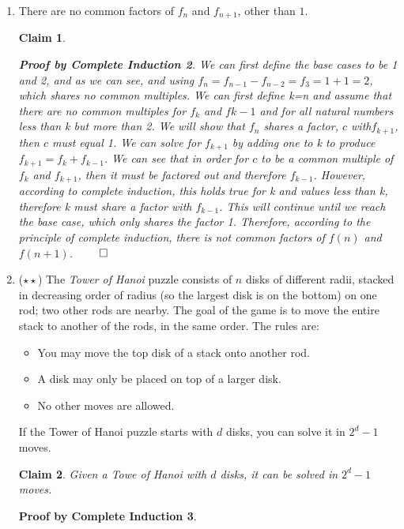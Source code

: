 \documentclass[10pt]{letter}
\newtheorem{PBCI}{Proof by Complete Induction}
\newtheorem{claim}{Claim}
\theoremstyle{definition}
\begin{document}
\begin{description}
\begin{enumerate}
\begin{PBCI}
Because of the principal of complete induction, we can see that this pattern holds for all $n+1$.
\end{PBCI}
		\item There are no common factors of $f_{n}$ and $f_{n+1}$, other than $1$.
\begin{claim}
\begin{PBCI}
We can first define the base cases to be 1 and 2, and as we can see, and using $f_n=f_{n-1}-f_{n-2}=f_3=1+1=2$, which shares no common multiples. We can first define k=n and assume that there are no common multiples for $f_{k}$ and $f{k-1}$ and for all natural numbers less than k but more than 2. We will show that $f_n$ shares a factor, $c$ with$f_{k+1}$, then $c$ must equal 1. We can solve for $f_{k+1}$ by adding one to k to produce $f_{k+1}=f_k+f_{k-1}$. We can see that in order for $c$ to be a common multiple of $f_k$ and $f_{k+1}$, then it must be factored out and therefore $f_{k-1}$. However, according to complete induction, this holds true for k and values less than k, therefore k must share a factor with $f_{k-1}$. This will continue until we reach the base case, which only shares the factor 1. Therefore, according to the principle of complete induction, there is not common factors of $f(n)$ and $f(n+1)$. $\qed$
\end{PBCI}
\end{claim}
		\item ($\star\star$) The {\em Tower of Hanoi} puzzle consists of $n$ disks of different radii, stacked in decreasing order of radius (so the largest disk is on the bottom) on one rod; two other rods are nearby. The goal of the game is to move the entire stack to another of the rods, in the same order. The rules are:
				\begin{itemize}
					\item You may move the top disk of a stack onto another rod.
					\item A disk may only be placed on top of a larger disk.
					\item No other moves are allowed.
				\end{itemize}
				If the Tower of Hanoi puzzle starts with $d$ disks, you can solve it in $2^d-1$ moves.
\begin{claim}
Given a Towe of Hanoi with $d$ disks, it can be solved in $2^d-1$ moves.
\end{claim}
\begin{PBCI}

\end{PBCI}
\end{enumerate}
\end{description}
\end{document}
